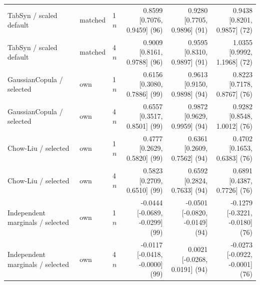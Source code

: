 \begin{tabular}{lllrrr}
TabSyn / scaled default & matched & 1$n$ & \shortstack{0.8599 \\ {[0.7076, 0.9459] (96)}} & \shortstack{0.9280 \\ {[0.7705, 0.9896] (91)}} & \shortstack{0.9438 \\ {[0.8201, 0.9857] (72)}} \\
TabSyn / scaled default & matched & 4$n$ & \shortstack{0.9009 \\ {[0.8161, 0.9788] (96)}} & \shortstack{0.9595 \\ {[0.8310, 0.9897] (91)}} & \shortstack{1.0355 \\ {[0.9992, 1.1968] (72)}} \\
GaussianCopula / selected & own & 1$n$ & \shortstack{0.6156 \\ {[0.3080, 0.7886] (99)}} & \shortstack{0.9613 \\ {[0.9150, 0.9898] (94)}} & \shortstack{0.8223 \\ {[0.7178, 0.8767] (76)}} \\
GaussianCopula / selected & own & 4$n$ & \shortstack{0.6557 \\ {[0.3517, 0.8501] (99)}} & \shortstack{0.9872 \\ {[0.9629, 0.9959] (94)}} & \shortstack{0.9282 \\ {[0.8548, 1.0012] (76)}} \\
Chow-Liu / selected & own & 1$n$ & \shortstack{0.4777 \\ {[0.2629, 0.5820] (99)}} & \shortstack{0.6361 \\ {[0.2609, 0.7562] (94)}} & \shortstack{0.4702 \\ {[0.1653, 0.6383] (76)}} \\
Chow-Liu / selected & own & 4$n$ & \shortstack{0.5823 \\ {[0.2709, 0.6510] (99)}} & \shortstack{0.6592 \\ {[0.2824, 0.7633] (94)}} & \shortstack{0.6891 \\ {[0.4387, 0.7726] (76)}} \\
Independent marginals / selected & own & 1$n$ & \shortstack{-0.0444 \\ {[-0.0689, -0.0299] (99)}} & \shortstack{-0.0501 \\ {[-0.0820, -0.0149] (94)}} & \shortstack{-0.1279 \\ {[-0.3221, -0.0180] (76)}} \\
Independent marginals / selected & own & 4$n$ & \shortstack{-0.0117 \\ {[-0.0418, -0.0000] (99)}} & \shortstack{0.0021 \\ {[-0.0268, 0.0191] (94)}} & \shortstack{-0.0273 \\ {[-0.0922, -0.0001] (76)}} \\

\end{tabular}
